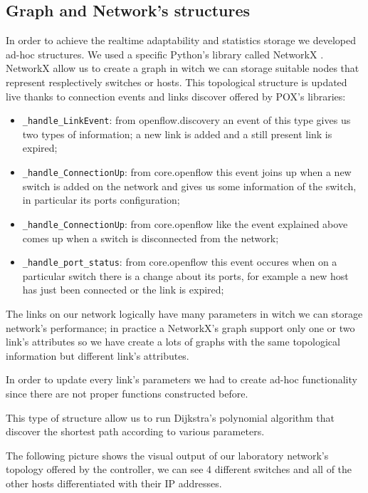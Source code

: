 \documentclass[article,10pt]{IEEEtran}
\begin{document}
\subsection{Graph and Network's structures}
  In order to achieve the realtime adaptability and statistics storage we developed ad-hoc structures.
  We used a specific Python's library called NetworkX \cite{networkx}. NetworkX allow us to create a graph in witch we can storage suitable nodes
  that represent resplectively switches or hosts.
  This topological structure is updated live thanks to connection events and links discover offered by POX's libraries:
  \begin{itemize}
   \item \texttt{_handle_LinkEvent}: from openflow.discovery an event of this type gives us two types of information; a new link is added and 
   a still present link is expired;
   \item \texttt{_handle_ConnectionUp}: from core.openflow this event joins up when a new switch is added on the network and gives us
   some information of the switch, in particular its ports configuration;
   \item \texttt{_handle_ConnectionUp}: from core.openflow like the event explained above comes up when a switch is disconnected from the network;
   \item \texttt{_handle_port_status}: from core.openflow this event occures when on a particular switch there is a change about its ports, for example
   a new host has just been connected or the link is expired;\\
  \end{itemize}

  
  The links on our network logically have many parameters in witch we can storage network's performance; in practice a NetworkX's graph support only 
  one or two link's attributes so we have create a lots of graphs with the same topological information but different link's attributes.
  
  In order to update every link's parameters we had to create ad-hoc functionality
  since there are not proper functions constructed before.
  
  This type of structure allow us to run Dijkstra's polynomial algorithm that discover the shortest path according to various parameters.
  
  The following picture shows the visual output of our laboratory network's topology offered by the controller, we can see 4 different switches and all of the other hosts
  differentiated with their IP addresses.
  
\end{document}
